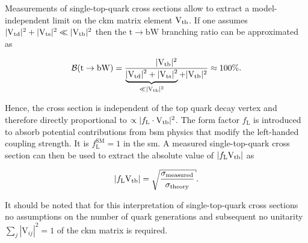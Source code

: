 
Measurements of single-top-quark cross sections allow to extract a model-independent limit on the \gls{ckm} matrix element ${\mathrm{V}_\mathrm{tb}}$. If one assumes $|{\mathrm{V}_\mathrm{td}}|^2+|{\mathrm{V}_\mathrm{ts}}|^2\ll|{\mathrm{V}_\mathrm{tb}}|^2$ then the $\mathrm{t}\to\mathrm{bW}$ branching ratio can be approximated as

\begin{equation}
\mathcal{B}(\mathrm{t}\to\mathrm{bW})=\frac{|{\mathrm{V}_\mathrm{tb}}|^2}{\underbrace{|{\mathrm{V}_\mathrm{td}}|^2+|{\mathrm{V}_\mathrm{ts}}|^2}_{\ll|{\mathrm{V}_\mathrm{tb}}|^2}+|{\mathrm{V}_\mathrm{tb}}|^2}\approx 100\%.
\end{equation}

Hence, the cross section is independent of the top quark decay vertex and therefore directly proportional to $\propto|f_\mathrm{L}\cdot{\mathrm{V}_\mathrm{tb}}|^2$. The form factor $f_\mathrm{L}$ is introduced to absorb potential contributions from \gls{bsm} physics that modify the left-handed coupling strength. It is $f_\mathrm{L}^\mathrm{SM}=1$ in the \gls{sm}. A measured single-top-quark cross section can then be used to extract the absolute value of $|f_\mathrm{L}{\mathrm{V}_\mathrm{tb}}|$ as

\begin{equation}
|f_\mathrm{L}\vtb|=\sqrt{\frac{\sigma_\mathrm{measured}}{\sigma_\mathrm{theory}}}.
\end{equation}

It should be noted that for this interpretation of single-top-quark cross sections no assumptions on the number of quark generations and subsequent no unitarity $\sum_j|\mathrm{V}_{ij}|^2=1$ of the \gls{ckm} matrix is required.




